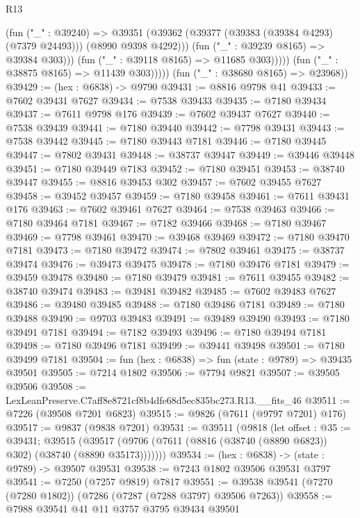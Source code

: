 \begin{lexlean}{R13}
\begin{coremodule}
                          (fun ("_" : @39240) =>
                          @39351
                            (@39362
                              (@39377 (@39383 (@39384 @4293) (@7379 @24493)))
                              (@8990 @9398 @4292)))
                          (fun ("_" : @39239 @8165) => @39384 @303)))
                      (fun ("_" : @39118 @8165) => @11685 @303)))))
              (fun ("_" : @38875 @8165) => @11439 @303)))))
      (fun ("_" : @38680 @8165) => @23968))
@39429 := (hex : @6838) -> @9790
@39431 := @8816 @9798 @41
@39433 := @7602 @39431 @7627
@39434 := @7538 @39433
@39435 := @7180 @39434
@39437 := @7611 @9798 @176
@39439 := @7602 @39437 @7627
@39440 := @7538 @39439
@39441 := @7180 @39440
@39442 := @7798 @39431
@39443 := @7538 @39442
@39445 := @7180 @39443 @7181
@39446 := @7180 @39445
@39447 := @7802 @39431
@39448 := @38737 @39447
@39449 := @39446 @39448
@39451 := @7180 @39449 @7183
@39452 := @7180 @39451
@39453 := @38740 @39447
@39455 := @8816 @39453 @302
@39457 := @7602 @39455 @7627
@39458 := @39452 @39457
@39459 := @7180 @39458
@39461 := @7611 @39431 @176
@39463 := @7602 @39461 @7627
@39464 := @7538 @39463
@39466 := @7180 @39464 @7181
@39467 := @7182 @39466
@39468 := @7180 @39467
@39469 := @7798 @39461
@39470 := @39468 @39469
@39472 := @7180 @39470 @7181
@39473 := @7180 @39472
@39474 := @7802 @39461
@39475 := @38737 @39474
@39476 := @39473 @39475
@39478 := @7180 @39476 @7181
@39479 := @39459 @39478
@39480 := @7180 @39479
@39481 := @7611 @39455
@39482 := @38740 @39474
@39483 := @39481 @39482
@39485 := @7602 @39483 @7627
@39486 := @39480 @39485
@39488 := @7180 @39486 @7181
@39489 := @7180 @39488
@39490 := @9703 @39483
@39491 := @39489 @39490
@39493 := @7180 @39491 @7181
@39494 := @7182 @39493
@39496 := @7180 @39494 @7181
@39498 := @7180 @39496 @7181
@39499 := @39441 @39498
@39501 := @7180 @39499 @7181
@39504 := fun (hex : @6838) => fun (state : @9789) => @39435 @39501
@39505 := @7214 @1802
@39506 := @7794 @9821
@39507 := @39505 @39506
@39508 := LexLeanPreserve.C7aff8e8721cf8b4dfe68d5ec835bc273.R13.__fits_46
@39511 := @7226 (@39508 @7201 @6823)
@39515 := @9826 (@7611 (@9797 @7201) @176)
@39517 := @9837 (@9838 @7201)
@39531 := @39511
    (@9818
      (let offset : @35 := @39431;
      @39515 (@39517 (@9706 (@7611 (@8816 (@38740 (@8890 @6823)) @302) (@38740 (@8890 @35173)))))))
@39534 := (hex : @6838) -> (state : @9789) -> @39507 @39531
@39538 := @7243 @1802 @39506 @39531 @3797
@39541 := @7250 (@7257 @9819) @7817
@39551 := @39538 @39541 (@7270 (@7280 @1802)) (@7286 (@7287 (@7288 @3797) @39506 @7263))
@39558 := @7988 @39541 @41 @11 @3757 @3795 @39434 @39501

\end{coremodule}
\end{lexlean}

